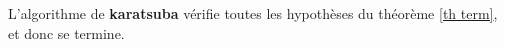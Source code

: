 \documentclass[11pt,french]{article}
\theoremstyle{plain}
\newtheorem*{notation}{Notation}
\newtheorem*{proof}{Preuve}
\newcommand{\x}{\times}
\begin{document}
L'algorithme de \textbf{karatsuba} vérifie toutes les hypothèses du théorème \ref{th term}, et donc se termine.



%
%
\end{document}

